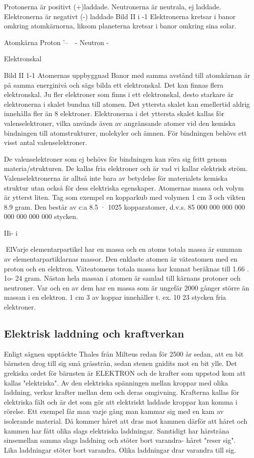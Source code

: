 \documentclass[a4paper,twoside,twocolumn,openright]{book}
\begin{document}
Protonerna är positivt (+)laddade.
Neutronerna är neutrala, ej laddade.
Elektronerna är negativt (-) laddade
Bild II i -1 Elektronerna kretsar i banor
omkring atomkärnorna, liksom planeterna
kretsar i banor omkring sina solar.

Atomkärna
Proton
'--\-~~- Neutron
-

Elektronskal

Bild II 1-1 Atomernas uppbyggnad
Banor med samma avstånd till atomkärnan är på samma energinivå och sägs bilda
ett elektronskal.
Det kan finnas flera elektronskal. Ju fler
elektroner som finns i ett elektronskal, desto
starkare är elektronerna i skalet bundna till
atomen. Det yttersta skalet kan emellertid
aldrig innehålla fler än 8 elektroner.
Elektronerna i det yttersta skalet kallas
för valenselektroner, vilka används även av
angränsande atomer vid den kemiska bindningen till atomstrukturer, molekyler och
ämnen. För bindningen behövs ett visst
antal valenselektroner.

De valenselektroner som ej behövs för
bindningen kan röra sig fritt genom materia/strukturen. De kallas fria elektroner och är vad vi kallar elektrisk ström.
Valenselektronerna är alltså inte bara av
betydelse för materialets kemiska struktur
utan också för dess elektriska egenskaper.
Atomernas massa och volym är ytterst
liten. Tag som exempel en kopparkub med
volymen 1 cm 3 och vikten 8.9 gram. Den
består av c:a 8.5 · 1025 kopparatomer, d.v.s.
85 000 000 000 000 000 000 000 000
stycken.

IIi- i

ElVarje elementarpartikel har en massa och
en atoms totala massa är summan av
elementarpartiklarnas massor. Den enklaste
atomen är väteatomen med en proton och
en elektron. Väteatomens totala massa har
kunnat beräknas till 1.66 . 1o- 24 gram.
Nästan hela massan i atomen är samlad
till kärnans protoner och neutroner. Var och
en av dem har en massa som är ungefär
2000 gånger större än massan i en elektron.
1 cm 3 av koppar innehåller t. ex. 10 23 stycken
fria elektroner.

\subsection{Elektrisk laddning och kraftverkan}

Enligt sägnen upptäckte Thales från Milteus
redan för 2500 år sedan, att en bit bärnsten
drog till sig små grässtrån, sedan stenen
gnidits mot en bit ylle. Det grekiska ordet för
bärnsten är ELEKTRON och de krafter som
uppstod kom att kallas "elektriska". Av den
elektriska spänningen mellan kroppar med
olika laddning, verkar krafter mellan dem
och deras omgivning. Krafterna kallas för
elektriska fält och är det som gör att elektriskt
laddade kroppar kan komma i rörelse.
Ett exempel får man varje gång man
kammar sig med en kam av isolerande material. Då kommer håret att dras mot kammen därför att håret och kammen har fått
olika slags elektriska laddningar. Samtidigt
har hårstråna sinsemellan samma slags laddning och stöter bort varandra- håret "reser
sig".
Lika laddningar stöter bort varandra.
Olika laddningar drar varandra till sig.
\end{document}
